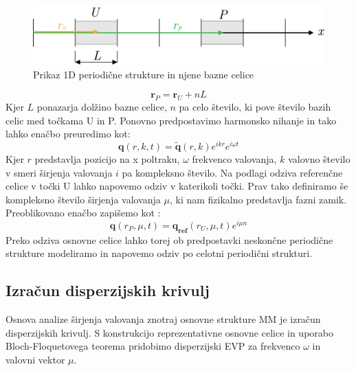 \documentclass[12pt]{report}
\begin{document}
\begin{figure}[H]
  \centering
  \includegraphics{Images/bloch.png}
  \caption{Prikaz 1D periodične strukture in njene bazne celice}
\end{figure}
\begin{equation}
  \mathbf{r}_P = \mathbf{r}_U + nL
\end{equation}
Kjer $L$ ponazarja dolžino bazne celice, $n$ pa celo število, ki pove število bazih celic med točkama U in P. Ponovno predpostavimo harmonsko
nihanje in tako lahko enačbo preuredimo kot:
\begin{equation}
  \mathbf{q}(r, k, t)  = \widetilde{\mathbf{q}}(r, k)e^{ik r}e^{i\omega t}
\end{equation}
Kjer $r$ predstavlja pozicijo na x poltraku, $\omega$ frekvenco valovanja, $k$ valovno število v smeri širjenja valovanja $i$ pa kompleksno število. Na podlagi odziva referenčne celice
v točki U lahko napovemo odziv v katerikoli točki. Prav tako definiramo še kompleksno število širjenja valovanja $\mu$, ki nam fizikalno predstavlja fazni zamik. Preoblikovano enačbo zapišemo
kot \cite{kosir}:
\begin{equation}
  \mathbf{q}(r_P, \mu, t)  = \mathbf{q_{ref}}(r_U, \mu,t)e^{i\mu n}
\end{equation} 
Preko odziva osnovne celice lahko torej ob predpostavki neskončne periodične strukture modeliramo in napovemo odziv po celotni
periodični strukturi.

\subsection{Izračun disperzijskih krivulj}
Osnova analize širjenja valovanja znotraj osnovne strukture \ac{MM} je izračun disperzijskih krivulj. S konstrukcijo reprezentativne
osnovne celice in uporabo Bloch-Floquetovega teorema pridobimo disperzijski \ac{EVP} za frekvenco $\omega$ in valovni vektor $\mu$. \cite{vanbelle}
\end{document}
